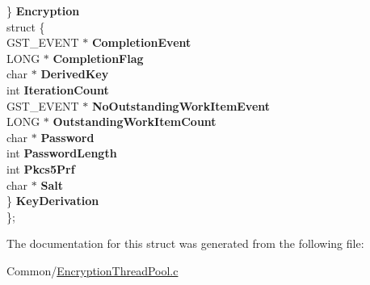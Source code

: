 \begin{DoxyCompactItemize}
\begin{tabbing}
\>\} {\bfseries Encryption}\\
\>struct \{\\
\>\>GST\_EVENT $\ast$ {\bfseries CompletionEvent}\\
\>\>LONG $\ast$ {\bfseries CompletionFlag}\\
\>\>char $\ast$ {\bfseries DerivedKey}\\
\>\>int {\bfseries IterationCount}\\
\>\>GST\_EVENT $\ast$ {\bfseries NoOutstandingWorkItemEvent}\\
\>\>LONG $\ast$ {\bfseries OutstandingWorkItemCount}\\
\>\>char $\ast$ {\bfseries Password}\\
\>\>int {\bfseries PasswordLength}\\
\>\>int {\bfseries Pkcs5Prf}\\
\>\>char $\ast$ {\bfseries Salt}\\
\>\} {\bfseries KeyDerivation}\\
\}; \\

\end{tabbing}\end{DoxyCompactItemize}


The documentation for this struct was generated from the following file\+:\begin{DoxyCompactItemize}
\item 
Common/\hyperlink{_encryption_thread_pool_8c}{Encryption\+Thread\+Pool.\+c}\end{DoxyCompactItemize}
